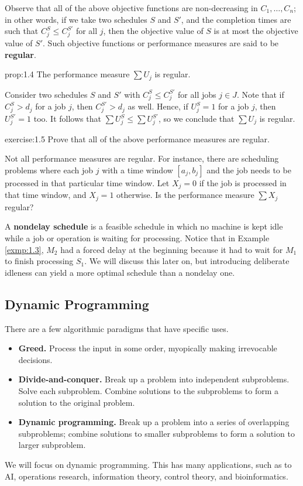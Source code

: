 Observe that all of the above objective functions are non-decreasing in 
$C_1, \dots, C_n$; in other words, if we take two schedules $S$ and $S'$, 
and the completion times are such that $C_j^S \leq C_j^{S'}$ for all 
$j$, then the objective value of $S$ is at most the objective value of $S'$. 
Such objective functions or performance measures are said to be {\bf regular}.

\begin{prop}{prop:1.4}
    The performance measure $\sum U_j$ is regular. 
\end{prop}
\begin{pf}
    Consider two schedules $S$ and $S'$ with $C_j^S \leq C_j^{S'}$ for all 
    jobs $j \in J$. Note that if $C_j^S > d_j$ for a job $j$, then 
    $C_j^{S'} > d_j$ as well. Hence, if $U_j^S = 1$ for a job $j$, then 
    $U_j^{S'} = 1$ too. It follows that $\sum U_j^S \leq \sum U_j^{S'}$, 
    so we conclude that $\sum U_j$ is regular. 
\end{pf}

\begin{exercise}{exercise:1.5}
    Prove that all of the above performance measures are regular.
\end{exercise}

Not all performance measures are regular. For instance, there are scheduling 
problems where each job $j$ with a time window $[a_j, b_j]$ and the 
job needs to be processed in that particular time window. Let $X_j = 0$ if the 
job is processed in that time window, and $X_j = 1$ otherwise. 
Is the performance measure $\sum X_j$ regular?

A {\bf nondelay schedule} is a feasible schedule in which no machine is kept 
idle while a job or operation is waiting for processing. Notice that in 
Example \ref{exmp:1.3}, $M_2$ had a forced delay at the beginning because 
it had to wait for $M_1$ to finish processing $S_1$. We will discuss this 
later on, but introducing deliberate idleness can yield a more optimal 
schedule than a nondelay one. 

\subsection{Dynamic Programming}\label{subsec:1.3}
There are a few algorithmic paradigms that have specific uses.
\begin{itemize}
    \item {\bf Greed.} Process the input in some order, myopically making 
    irrevocable decisions.
    \item {\bf Divide-and-conquer.} Break up a problem into independent 
    subproblems. Solve each subproblem. Combine solutions to the subproblems to 
    form a solution to the original problem.
    \item {\bf Dynamic programming.} Break up a problem into a series of 
    overlapping subproblems; combine solutions to smaller subproblems to 
    form a solution to larger subproblem.
\end{itemize}
We will focus on dynamic programming. This has many applications, such as 
to AI, operations research, information theory, control theory, and 
bioinformatics. 

